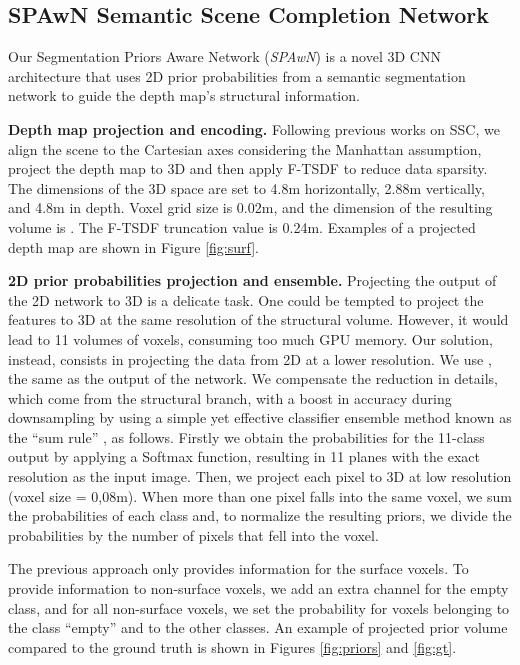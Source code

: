 \subsection{SPAwN Semantic Scene Completion Network}
Our Segmentation Priors Aware Network (\emph{SPAwN}) is a novel 3D CNN  architecture that uses 2D prior probabilities from a semantic segmentation network to guide the depth map's structural information.

\textbf{Depth map projection and encoding.} Following previous works on SSC, we align the scene to the Cartesian axes considering the Manhattan assumption, project the depth map to 3D and then apply F-TSDF \cite{song_semantic_2017} to reduce data sparsity. The dimensions of the 3D space are set to 4.8m horizontally, 2.88m vertically, and 4.8m in depth. Voxel grid size is 0.02m, and the dimension of the resulting volume is . The F-TSDF truncation value is 0.24m. Examples of a projected depth map are shown in Figure \ref{fig:surf}.

\textbf{2D prior probabilities projection and ensemble.} Projecting the output of the 2D network to 3D is a delicate task. One could be tempted to project the features to 3D at the same resolution of the structural volume. However, it would lead to 11 volumes of  voxels, consuming too much GPU memory. 
Our solution, instead, consists in projecting the data from 2D at a lower resolution. We use , the same as the output of the network. We compensate the reduction in details, which come from the structural branch, with a boost in accuracy during downsampling by using a simple yet effective classifier ensemble method known as the ``sum rule'' \cite{Kittler_1998}, as follows. Firstly we obtain the probabilities for the 11-class output by applying a Softmax function, resulting in 11 planes with the exact resolution as the input image. Then, we project each pixel to 3D at low resolution (voxel size = 0,08m). When more than one pixel falls into the same voxel, we sum the probabilities of each class and, to normalize the resulting priors, we divide the probabilities by the number of pixels that fell into the voxel.


The previous approach only provides information for the surface voxels. To provide information to non-surface voxels, we add an extra channel for the empty class, and for all non-surface voxels, we set the probability  for voxels belonging to the class ``empty'' and  to the other  classes. An example of projected prior volume compared to the ground truth is shown in Figures \ref{fig:priors} and \ref{fig:gt}.


